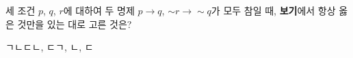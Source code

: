 세 조건 $p$, $q$, $r$에 대하여 두 명제 $p\longrightarrow q$, $\sim r\longrightarrow \sim q$가 모두 참일 때, \textbf{보기}에서 항상 옳은 것만을 있는 대로 고른 것은? 
\begin{choices32}{ㄱ}{ㄴ}{ㄷ}{ㄴ, ㄷ}{ㄱ, ㄴ, ㄷ}\end{choices32}
